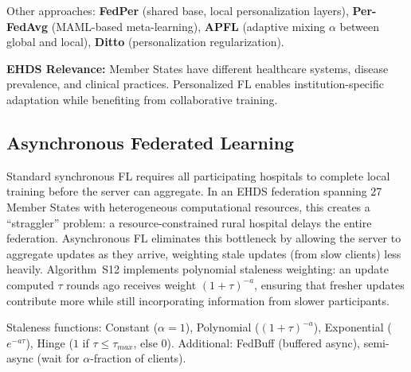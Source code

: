 \documentclass[conference]{IEEEtran}
\begin{document}
Other approaches: \textbf{FedPer} (shared base, local personalization layers), \textbf{Per-FedAvg} (MAML-based meta-learning), \textbf{APFL} (adaptive mixing $\alpha$ between global and local), \textbf{Ditto} (personalization regularization).

\textbf{EHDS Relevance:} Member States have different healthcare systems, disease prevalence, and clinical practices. Personalized FL enables institution-specific adaptation while benefiting from collaborative training.

\subsection{Asynchronous Federated Learning}

Standard synchronous FL requires all participating hospitals to complete local training before the server can aggregate. In an EHDS federation spanning 27 Member States with heterogeneous computational resources, this creates a ``straggler'' problem: a resource-constrained rural hospital delays the entire federation. Asynchronous FL eliminates this bottleneck by allowing the server to aggregate updates as they arrive, weighting stale updates (from slow clients) less heavily. Algorithm~S12 implements polynomial staleness weighting: an update computed $\tau$ rounds ago receives weight $(1+\tau)^{-a}$, ensuring that fresher updates contribute more while still incorporating information from slower participants.

\begin{figure}[htbp]
\centering
{}
\end{figure}

Staleness functions: Constant ($\alpha{=}1$), Polynomial ($(1{+}\tau)^{-a}$), Exponential ($e^{-a\tau}$), Hinge ($1$ if $\tau \leq \tau_{max}$, else $0$). Additional: FedBuff (buffered async), semi-async (wait for $\alpha$-fraction of clients).
\end{document}
